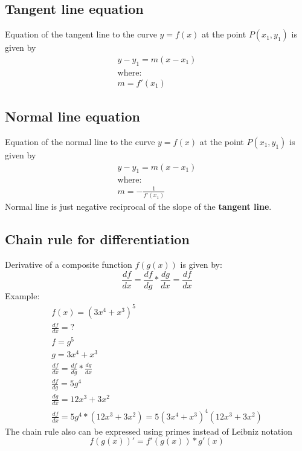 \documentclass{article}
\begin{document}
\subsection{Tangent line equation}
Equation of the tangent line to the curve $y=f(x)$ at the point $P(x_1, y_1)$ is given by
\begin{equation}
  \begin{gathered}
    y - y_1 = m(x - x_1) \\
    \text{where:} \\
    m = f'(x_1)
  \end{gathered}
\end{equation}

\subsection{Normal line equation}
Equation of the normal line to the curve $y=f(x)$ at the point $P(x_1, y_1)$ is given by
\begin{equation}
  \begin{gathered}
    y - y_1 = m(x - x_1) \\
    \text{where:} \\
    m = -\frac{1}{f'(x_1)}
  \end{gathered}
\end{equation}
Normal line is just negative reciprocal of the slope of the \textbf{tangent line}.

\subsection{Chain rule for differentiation}
Derivative of a composite function $f(g(x))$ is given by:
\begin{equation}
  \frac{df}{dx} = \frac{df}{dg} * \frac{dg}{dx} = \frac{df}{dx}
\end{equation}
Example:
\begin{equation}
  \begin{gathered}
    f(x) = (3x^4 + x^3)^5 \\
    \frac{df}{dx} = ? \\
    f = g^5 \\
    g = 3x^4 + x^3 \\
    \frac{df}{dx} = \frac{df}{dg} * \frac{dg}{dx} \\
    \frac{df}{dg} = 5g^4 \\
    \frac{dg}{dx} = 12x^3 + 3x^2 \\
    \frac{df}{dx} = 5g^4 * (12x^3 + 3x^2) = 5(3x^4 + x^3)^4(12x^3 + 3x^2)
  \end{gathered}
\end{equation}
The chain rule also can be expressed using primes instead of Leibniz notation
\begin{equation}
  f(g(x))' = f'(g(x)) * g'(x)
\end{equation}
\end{document}

